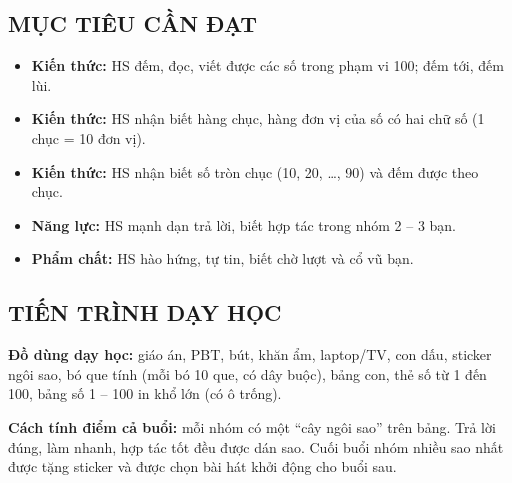 \documentclass[../main.tex]{subfiles}
\begin{document}
\subsection{MỤC TIÊU CẦN ĐẠT}
\begin{itemize}
    \item \textbf{Kiến thức:} HS đếm, đọc, viết được các số trong phạm vi 100; đếm tới, đếm lùi.
    \item \textbf{Kiến thức:} HS nhận biết hàng chục, hàng đơn vị của số có hai chữ số (1 chục = 10 đơn vị).
    \item \textbf{Kiến thức:} HS nhận biết số tròn chục (10, 20, \dots, 90) và đếm được theo chục.
    \item \textbf{Năng lực:} HS mạnh dạn trả lời, biết hợp tác trong nhóm 2 -- 3 bạn.
    \item \textbf{Phẩm chất:} HS hào hứng, tự tin, biết chờ lượt và cổ vũ bạn.
\end{itemize}

\subsection{TIẾN TRÌNH DẠY HỌC}
\textbf{Đồ dùng dạy học:} giáo án, PBT, bút, khăn ẩm, laptop/TV, con dấu, sticker ngôi sao, bó que tính (mỗi bó 10 que, có dây buộc), bảng con, thẻ số từ 1 đến 100, bảng số 1 -- 100 in khổ lớn (có ô trống).

\begin{luuy}
    \textbf{Cách tính điểm cả buổi:} mỗi nhóm có một “cây ngôi sao” trên bảng. Trả lời đúng, làm nhanh, hợp tác tốt đều được dán sao. Cuối buổi nhóm nhiều sao nhất được tặng sticker và được chọn bài hát khởi động cho buổi sau.
\end{luuy}

\end{document}
